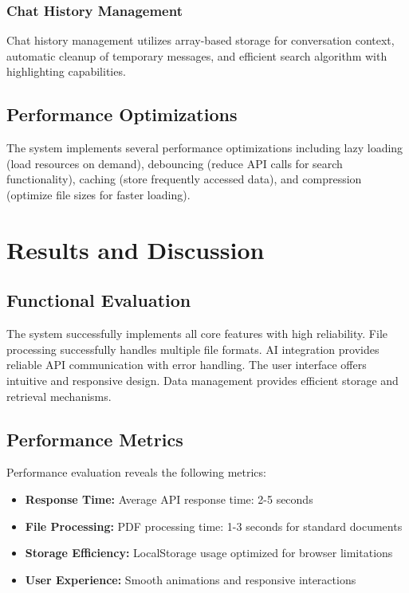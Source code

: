 \documentclass[conference]{IEEEtran}
\begin{document}
\subsubsection{Chat History Management}
Chat history management utilizes array-based storage for conversation context, automatic cleanup of temporary messages, and efficient search algorithm with highlighting capabilities.

\subsection{Performance Optimizations}
The system implements several performance optimizations including lazy loading (load resources on demand), debouncing (reduce API calls for search functionality), caching (store frequently accessed data), and compression (optimize file sizes for faster loading).

\section{Results and Discussion}

\subsection{Functional Evaluation}
The system successfully implements all core features with high reliability. File processing successfully handles multiple file formats. AI integration provides reliable API communication with error handling. The user interface offers intuitive and responsive design. Data management provides efficient storage and retrieval mechanisms.

\subsection{Performance Metrics}
Performance evaluation reveals the following metrics:
\begin{itemize}[itemsep=0pt, parsep=0pt, leftmargin=*]
    \item \textbf{Response Time:} Average API response time: 2-5 seconds
    \item \textbf{File Processing:} PDF processing time: 1-3 seconds for standard documents
    \item \textbf{Storage Efficiency:} LocalStorage usage optimized for browser limitations
    \item \textbf{User Experience:} Smooth animations and responsive interactions
\end{itemize}
\end{document}
